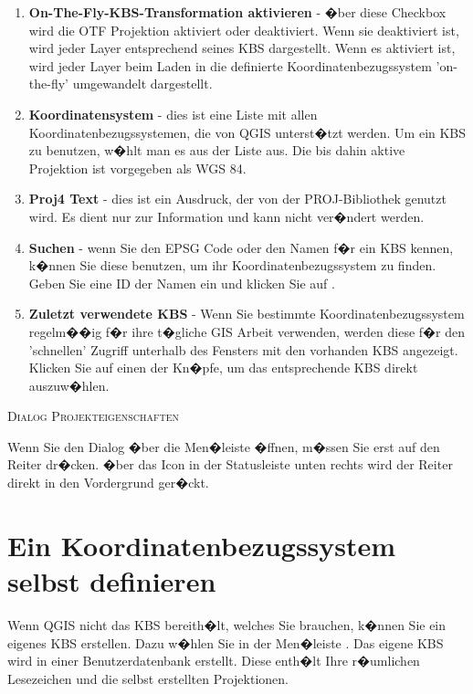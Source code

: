 \begin{enumerate}
\item \textbf{On-The-Fly-KBS-Transformation
aktivieren} 
- �ber diese Checkbox wird die OTF Projektion aktiviert oder deaktiviert.
  Wenn sie deaktiviert ist, wird jeder Layer entsprechend seines KBS
  dargestellt. Wenn es aktiviert ist, wird jeder Layer beim Laden in die
definierte Koordinatenbezugssystem 'on-the-fly' umgewandelt dargestellt.
\item \textbf{Koordinatensystem} - dies ist eine Liste mit allen
Koordinatenbezugssystemen, die von QGIS unterst�tzt werden. Um ein
KBS zu benutzen, w�hlt man es aus der Liste aus. Die bis dahin aktive
Projektion ist vorgegeben als WGS 84.
\item \textbf{Proj4 Text} - dies ist ein Ausdruck, der von der PROJ-Bibliothek
genutzt wird. Es dient nur zur Information und kann nicht ver�ndert werden.
\item \textbf{Suchen} - wenn Sie den EPSG Code oder den Namen f�r ein KBS
kennen, k�nnen Sie diese benutzen, um ihr Koordinatenbezugssystem zu finden.
Geben Sie eine ID  der Namen ein und klicken Sie auf .
\item \textbf{Zuletzt verwendete KBS} - Wenn Sie bestimmte
Koordinatenbezugssystem regelm��ig f�r ihre t�gliche GIS Arbeit verwenden,
werden diese f�r den 'schnellen' Zugriff unterhalb des Fensters mit den
vorhanden KBS angezeigt. Klicken Sie auf einen der Kn�pfe, um das
entsprechende KBS direkt auszuw�hlen.
\end{enumerate}

\begin{Tip}
\caption{\textsc{Dialog Projekteigenschaften}}
Wenn Sie den Dialog  �ber die Men�leiste �ffnen, 
m�ssen Sie erst auf den Reiter  dr�cken. �ber das 
 Icon in der Statusleiste unten rechts 
wird der Reiter  direkt in den Vordergrund ger�ckt.
\end{Tip}

\section{Ein Koordinatenbezugssystem selbst definieren}
\label{sec:customprojections}

Wenn QGIS nicht das KBS bereith�lt, welches Sie brauchen, k�nnen Sie ein
eigenes KBS erstellen. Dazu w�hlen Sie in der Men�leiste
 \arrow
{}. Das eigene KBS
wird in einer Benutzerdatenbank erstellt. Diese enth�lt Ihre r�umlichen
Lesezeichen und die selbst erstellten Projektionen.


